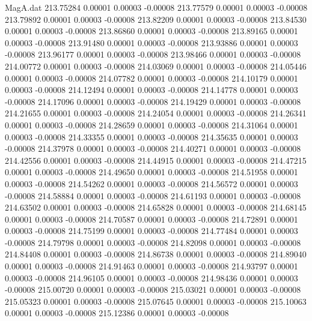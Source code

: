 \begin{filecontents}{MagA.dat}
 213.75284    0.00001    0.00003   -0.00008
 213.77579    0.00001    0.00003   -0.00008
 213.79892    0.00001    0.00003   -0.00008
 213.82209    0.00001    0.00003   -0.00008
 213.84530    0.00001    0.00003   -0.00008
 213.86860    0.00001    0.00003   -0.00008
 213.89165    0.00001    0.00003   -0.00008
 213.91480    0.00001    0.00003   -0.00008
 213.93886    0.00001    0.00003   -0.00008
 213.96177    0.00001    0.00003   -0.00008
 213.98466    0.00001    0.00003   -0.00008
 214.00772    0.00001    0.00003   -0.00008
 214.03069    0.00001    0.00003   -0.00008
 214.05446    0.00001    0.00003   -0.00008
 214.07782    0.00001    0.00003   -0.00008
 214.10179    0.00001    0.00003   -0.00008
 214.12494    0.00001    0.00003   -0.00008
 214.14778    0.00001    0.00003   -0.00008
 214.17096    0.00001    0.00003   -0.00008
 214.19429    0.00001    0.00003   -0.00008
 214.21655    0.00001    0.00003   -0.00008
 214.24054    0.00001    0.00003   -0.00008
 214.26341    0.00001    0.00003   -0.00008
 214.28659    0.00001    0.00003   -0.00008
 214.31064    0.00001    0.00003   -0.00008
 214.33355    0.00001    0.00003   -0.00008
 214.35635    0.00001    0.00003   -0.00008
 214.37978    0.00001    0.00003   -0.00008
 214.40271    0.00001    0.00003   -0.00008
 214.42556    0.00001    0.00003   -0.00008
 214.44915    0.00001    0.00003   -0.00008
 214.47215    0.00001    0.00003   -0.00008
 214.49650    0.00001    0.00003   -0.00008
 214.51958    0.00001    0.00003   -0.00008
 214.54262    0.00001    0.00003   -0.00008
 214.56572    0.00001    0.00003   -0.00008
 214.58884    0.00001    0.00003   -0.00008
 214.61193    0.00001    0.00003   -0.00008
 214.63502    0.00001    0.00003   -0.00008
 214.65828    0.00001    0.00003   -0.00008
 214.68145    0.00001    0.00003   -0.00008
 214.70587    0.00001    0.00003   -0.00008
 214.72891    0.00001    0.00003   -0.00008
 214.75199    0.00001    0.00003   -0.00008
 214.77484    0.00001    0.00003   -0.00008
 214.79798    0.00001    0.00003   -0.00008
 214.82098    0.00001    0.00003   -0.00008
 214.84408    0.00001    0.00003   -0.00008
 214.86738    0.00001    0.00003   -0.00008
 214.89040    0.00001    0.00003   -0.00008
 214.91463    0.00001    0.00003   -0.00008
 214.93797    0.00001    0.00003   -0.00008
 214.96105    0.00001    0.00003   -0.00008
 214.98436    0.00001    0.00003   -0.00008
 215.00720    0.00001    0.00003   -0.00008
 215.03021    0.00001    0.00003   -0.00008
 215.05323    0.00001    0.00003   -0.00008
 215.07645    0.00001    0.00003   -0.00008
 215.10063    0.00001    0.00003   -0.00008
 215.12386    0.00001    0.00003   -0.00008

\end{filecontents}

